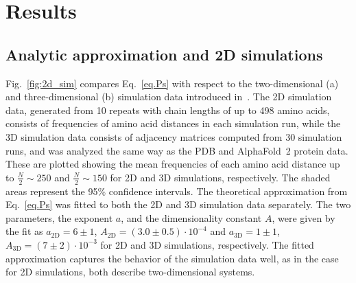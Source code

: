 \documentclass[
reprint,
twocolumn,
amsmath,amssymb,superscriptaddress,aps,
pre]{revtex4-1}
\begin{document}



\section{Results}
\subsection{Analytic approximation and 2D simulations}
Fig.~\ref{fig:2d_sim} compares Eq.~\ref{eq.Ps} with respect to the two-dimensional (a) and three-dimensional (b) simulation data introduced in~\cite{molkenthin2020self}. The 2D simulation data, generated from 10 repeats with chain lengths of up to 498 amino acids, consists of frequencies of amino acid distances in each simulation run, while the 3D simulation data consists of adjacency matrices computed from 30 simulation runs, and was analyzed the same way as the PDB and AlphaFold~2 protein data. These are plotted showing the mean frequencies of each amino acid distance up to $\frac{N}{2}\sim250$ and $\frac{N}{2}\sim150$ for 2D and 3D simulations, respectively. The shaded areas represent the 95\% confidence intervals. The theoretical approximation from Eq.~\ref{eq.Ps} was fitted to both the 2D and 3D simulation data separately. The two parameters, the exponent $a$, and the dimensionality constant $A$, were given by the fit as $a_{\mathrm{2D}}=6 \pm 1$, $A_{\mathrm{2D}}=(3.0 \pm 0.5)\cdot 10^{-4}$ and $a_{\mathrm{3D}}=1 \pm 1$, $A_{\mathrm{3D}}=(7 \pm 2)\cdot 10^{-3}$ for 2D and 3D simulations, respectively. The fitted approximation captures the behavior of the simulation data well, as in the case for 2D simulations, both describe two-dimensional systems.
\end{document}
